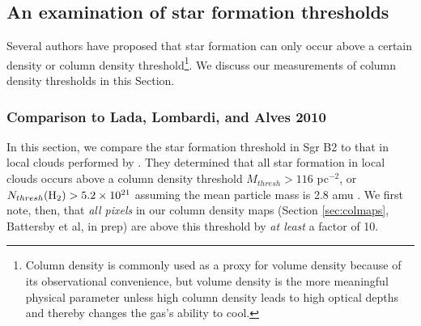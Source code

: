 \documentclass[twocolumn]{aastex61}
\begin{document}
% 

\subsection{An examination of star formation thresholds}
\label{sec:thresholds}
Several authors \citep[e.g.,][]{Lada2010a,Heiderman2010a} have proposed that star
formation can only occur above a certain density or column density
threshold\footnote{Column density is commonly used as a proxy for volume
density because of its observational convenience, but volume density is the
more meaningful physical parameter unless high column density leads to high
optical depths and thereby changes the gas's ability to cool.}. 
We discuss our measurements of column density thresholds in this Section.



\subsubsection{Comparison to Lada, Lombardi, and Alves 2010}
\label{sec:ladathreshold}
In this section, we compare the star formation threshold in Sgr B2 to that in
local clouds performed by \citet{Lada2010a}.  They determined that all star
formation in local clouds occurs above a column density threshold $M_{thresh} >
116$ \msun pc$^{-2}$, or $N_{thresh}(\textrm{H}_{2}) > 5.2\times10^{21}$ \persc assuming the
mean particle mass is 2.8 amu \citep{Kauffmann2008a}.  We first note, then,
that \emph{all pixels} in our column density maps (Section \ref{sec:colmaps},
Battersby et al, in prep) are above this threshold by \emph{at least} a factor
of 10.
\end{document}
